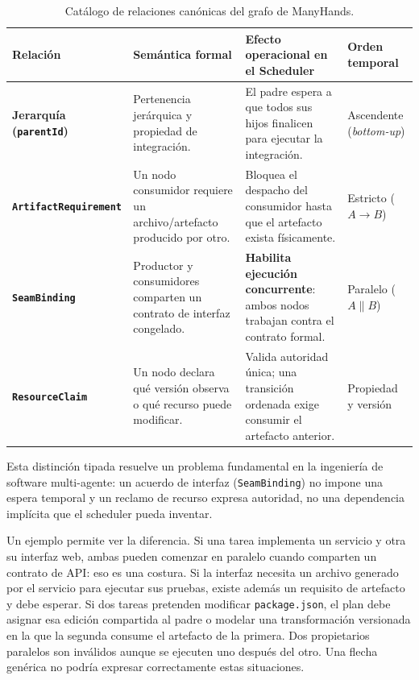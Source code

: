\begin{table}[htbp]
  \centering
  \caption{Catálogo de relaciones canónicas del grafo de ManyHands.}
  \label{tab:relaciones-canonicas}
  \small
  \begin{tabularx}{\textwidth}{@{}l p{4.2cm} X l@{}}
    \toprule
    \textbf{Relación} & \textbf{Semántica formal} & \textbf{Efecto operacional en el Scheduler} & \textbf{Orden temporal} \\
    \midrule
    \textbf{Jerarquía (\texttt{parentId})} & Pertenencia jerárquica y propiedad de integración. & El padre espera a que todos sus hijos finalicen para ejecutar la integración. & Ascendente (\emph{bottom-up}) \\
    \textbf{\texttt{ArtifactRequirement}} & Un nodo consumidor requiere un archivo/artefacto producido por otro. & Bloquea el despacho del consumidor hasta que el artefacto exista físicamente. & Estricto ($A \rightarrow B$) \\
    \textbf{\texttt{SeamBinding}} & Productor y consumidores comparten un contrato de interfaz congelado. & \textbf{Habilita ejecución concurrente}: ambos nodos trabajan contra el contrato formal. & Paralelo ($A \parallel B$) \\
    \textbf{\texttt{ResourceClaim}} & Un nodo declara qué versión observa o qué recurso puede modificar. & Valida autoridad única; una transición ordenada exige consumir el artefacto anterior. & Propiedad y versión \\
    \bottomrule
  \end{tabularx}
\end{table}

Esta distinción tipada resuelve un problema fundamental en la ingeniería de
software multi-agente: un acuerdo de interfaz (\texttt{SeamBinding}) no impone
una espera temporal y un reclamo de recurso expresa autoridad, no una
dependencia implícita que el scheduler pueda inventar.

Un ejemplo permite ver la diferencia. Si una tarea implementa un servicio y otra
su interfaz web, ambas pueden comenzar en paralelo cuando comparten un contrato
de API: eso es una costura. Si la interfaz necesita un archivo generado por el
servicio para ejecutar sus pruebas, existe además un requisito de artefacto y
debe esperar. Si dos tareas pretenden modificar \texttt{package.json}, el plan
debe asignar esa edición compartida al padre o modelar una transformación
versionada en la que la segunda consume el artefacto de la primera. Dos
propietarios paralelos son inválidos aunque se ejecuten uno después del otro.
Una flecha genérica no podría expresar correctamente estas situaciones.

